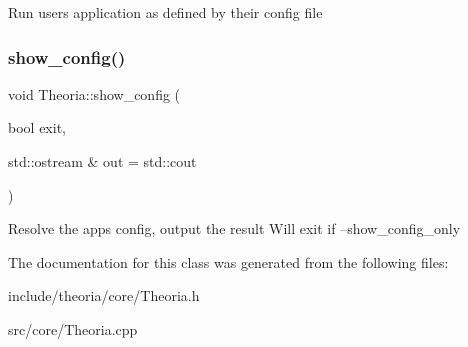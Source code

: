 Run user\textquotesingle{}s application as defined by their config file \mbox{\label{classtheoria_1_1core_1_1Theoria_aa8290357bebef4260863997d1756f10a}} 
\subsubsection{\texorpdfstring{show\+\_\+config()}{show\_config()}}
{\footnotesize\ttfamily void Theoria\+::show\+\_\+config (\begin{DoxyParamCaption}\item[{bool}]{exit,  }\item[{std\+::ostream \&}]{out = {\ttfamily std\+:\+:cout} }\end{DoxyParamCaption})}

Resolve the apps config, output the result Will exit if --show\+\_\+config\+\_\+only 

The documentation for this class was generated from the following files\+:\begin{DoxyCompactItemize}
\item 
include/theoria/core/Theoria.\+h\item 
src/core/Theoria.\+cpp\end{DoxyCompactItemize}
